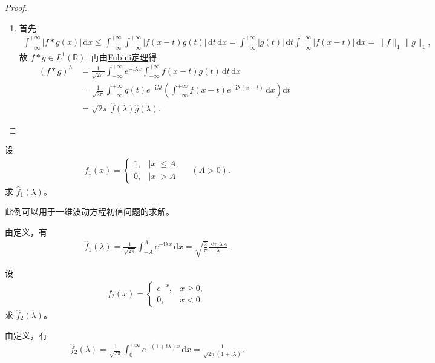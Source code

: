 \documentclass[../../main.tex]{subfiles}%
\begin{document}
\begin{proof}
\begin{enumerate}[(1)]
\item 首先
\begin{align*}
\int_{-\infty}^{+\infty}|f*g(x)|\,\mathrm{d}x
\leqslant \int_{-\infty}^{+\infty}\int_{-\infty}^{+\infty}|f(x-t)g(t)|\,\mathrm{d}t\,\mathrm{d}x 
=\int_{-\infty}^{+\infty}|g(t)|\,\mathrm{d}t\int_{-\infty}^{+\infty}|f(x-t)|\,\mathrm{d}x
=\|f\|_1\|g\|_1,
\end{align*}
故 $f*g\in L^1(\mathbb{R})$. 再由\hyperref[Real Analysis-theorem:Fubini定理 可积函数的情形]{Fubini定理}得
\begin{align*}
(f*g)^\wedge
&=\frac{1}{\sqrt{2\pi}}\int_{-\infty}^{+\infty}e^{-\mathrm{i}\lambda x}\int_{-\infty}^{+\infty}f(x-t)g(t)\,\mathrm{d}t\,\mathrm{d}x \\
&=\frac{1}{\sqrt{2\pi}}\int_{-\infty}^{+\infty}g(t)e^{-\mathrm{i}\lambda t}
\left(\int_{-\infty}^{+\infty}f(x-t)e^{-\mathrm{i}\lambda (x-t)}\,\mathrm{d}x\right)\mathrm{d}t \\
&=\sqrt{2\pi}\,\hat{f}(\lambda)\hat{g}(\lambda).
\end{align*}
\end{enumerate}
\end{proof}

\begin{example}
设
\begin{align*}
f_1(x)=\begin{cases}
1, & |x|\leqslant A,\\
0, & |x|>A
\end{cases}\quad (A>0).
\end{align*}
求 $\hat{f}_1(\lambda)$。
\end{example}
\begin{remark}
此例可以用于一维波动方程初值问题的求解。
\end{remark}
\begin{solution}
由定义，有
\begin{align*}
\hat{f}_1(\lambda)=\frac{1}{\sqrt{2\pi}}\int_{-A}^{A}e^{-\mathrm{i}\lambda  x}\,\mathrm{d}x=\sqrt{\frac{2}{\pi}}\frac{\sin\lambda A}{\lambda}.
\end{align*}
\end{solution}

\begin{example}
设
\begin{align*}
f_2(x)=\begin{cases}
e^{-x}, & x\geqslant 0,\\
0, & x<0.
\end{cases}
\end{align*}
求 $\hat{f}_2(\lambda)$。
\end{example}
\begin{solution}
由定义，有
\begin{align*}
\hat{f}_2(\lambda)=\frac{1}{\sqrt{2\pi}}\int_0^{+\infty}e^{-(1+\mathrm{i}\lambda )x}\,\mathrm{d}x=\frac{1}{\sqrt{2\pi}(1+\mathrm{i}\lambda )}.
\end{align*}
\end{solution}
\end{document}
